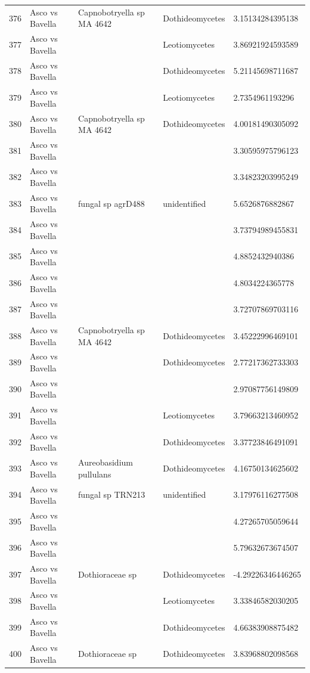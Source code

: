 \documentclass[12pt]{article}\usepackage[]{graphicx}\usepackage[]{color}
\numberwithin{figure}{section}
\begin{document}
\begin{table}[ht]
\begin{tabular}{lllll}
  376 & Asco vs Bavella & Capnobotryella sp MA 4642 & Dothideomycetes & 3.15134284395138 \\ 
  377 & Asco vs Bavella &  & Leotiomycetes & 3.86921924593589 \\ 
  378 & Asco vs Bavella &  & Dothideomycetes & 5.21145698711687 \\ 
  379 & Asco vs Bavella &  & Leotiomycetes & 2.7354961193296 \\ 
  380 & Asco vs Bavella & Capnobotryella sp MA 4642 & Dothideomycetes & 4.00181490305092 \\ 
  381 & Asco vs Bavella &  &  & 3.30595975796123 \\ 
  382 & Asco vs Bavella &  &  & 3.34823203995249 \\ 
  383 & Asco vs Bavella & fungal sp agrD488 & unidentified & 5.6526876882867 \\ 
  384 & Asco vs Bavella &  &  & 3.73794989455831 \\ 
  385 & Asco vs Bavella &  &  & 4.8852432940386 \\ 
  386 & Asco vs Bavella &  &  & 4.8034224365778 \\ 
  387 & Asco vs Bavella &  &  & 3.72707869703116 \\ 
  388 & Asco vs Bavella & Capnobotryella sp MA 4642 & Dothideomycetes & 3.45222996469101 \\ 
  389 & Asco vs Bavella &  & Dothideomycetes & 2.77217362733303 \\ 
  390 & Asco vs Bavella &  &  & 2.97087756149809 \\ 
  391 & Asco vs Bavella &  & Leotiomycetes & 3.79663213460952 \\ 
  392 & Asco vs Bavella &  & Dothideomycetes & 3.37723846491091 \\ 
  393 & Asco vs Bavella & Aureobasidium pullulans & Dothideomycetes & 4.16750134625602 \\ 
  394 & Asco vs Bavella & fungal sp TRN213 & unidentified & 3.17976116277508 \\ 
  395 & Asco vs Bavella &  &  & 4.27265705059644 \\ 
  396 & Asco vs Bavella &  &  & 5.79632673674507 \\ 
  397 & Asco vs Bavella & Dothioraceae sp & Dothideomycetes & -4.29226346446265 \\ 
  398 & Asco vs Bavella &  & Leotiomycetes & 3.33846582030205 \\ 
  399 & Asco vs Bavella &  & Dothideomycetes & 4.66383908875482 \\ 
  400 & Asco vs Bavella & Dothioraceae sp & Dothideomycetes & 3.83968802098568 \\ 

\end{tabular}
\end{table}
\end{document}
